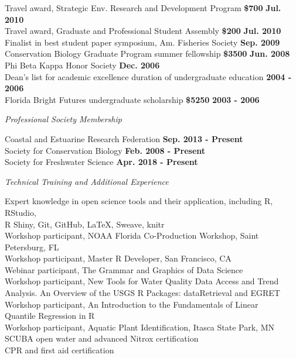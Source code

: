 \documentclass[letterpaper,12pt]{article}
\newcommand{\sectitle}[1]{\vspace{\baselineskip} \centerline{\large{\textit{#1}}}}
\begin{document}
Travel award, Strategic Env. Research and Development Program {\bf \$700} \hfill {\bf Jul. 2010} \\
Travel award, Graduate and Professional Student Assembly {\bf \$200} \hfill {\bf Jul. 2010} \\
Finalist in best student paper symposium, Am. Fisheries Society \hfill {\bf Sep. 2009} \\
Conservation Biology Graduate Program summer fellowship {\bf \$3500} \hfill {\bf Jun. 2008} \\
Phi Beta Kappa Honor Society \hfill {\bf Dec. 2006} \\
Dean's list for academic excellence duration of undergraduate education \hfill {\bf 2004 - 2006} \\
Florida Bright Futures undergraduate scholarship {\bf \$5250} \hfill {\bf 2003 - 2006} 

\sectitle{Professional Society Membership}

Coastal and Estuarine Research Federation \hfill {\bf Sep. 2013 - Present} \\
Society for Conservation Biology \hfill {\bf Feb. 2008 - Present} \\
Society for Freshwater Science \hfill {\bf Apr. 2018 - Present}

\sectitle{Technical Training and Additional Experience}

Expert knowledge in open science tools and their application, including R, RStudio, \\
\hspace{0.3in}R Shiny, Git, GitHub, \LaTeX, Sweave, knitr \\
Workshop participant, NOAA Florida Co-Production Workshop, Saint Petersburg, FL \\
Workshop participant, Master R Developer, San Francisco, CA \\
Webinar participant, The Grammar and Graphics of Data Science \\
Workshop participant, New Tools for Water Quality Data Access and Trend \\ \hspace{0.3in} Analysis. An Overview of the USGS R Packages: dataRetrieval and EGRET\\
Workshop participant, An Introduction to the Fundamentals of Linear \\
\hspace{0.3in}Quantile Regression in R \\
Workshop participant, Aquatic Plant Identification, Itasca State Park, MN \\
SCUBA open water and advanced Nitrox certification \\
CPR and first aid certification
\end{document}

